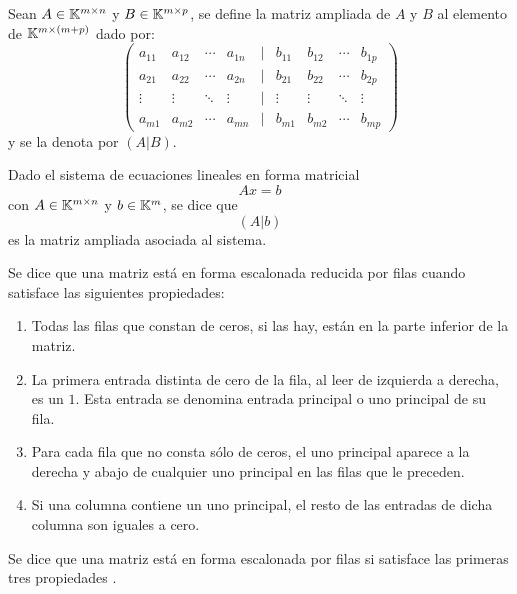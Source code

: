 \documentclass[a4,11pt]{aleph-notas}
\begin{document}
\begin{defi}
    Sean $A\in\Mat[\K]{m}{n}$ y $B\in\Mat[\K]{m}{p}$, se define la matriz ampliada de $A$ y $B$ al elemento de $\Mat[\K]{m}{(m+p)}$ dado por:
    \[
        \begin{pmatrix}
        a_{11}&a_{12}&\cdots&a_{1n}&|&b_{11}&b_{12}&\cdots&b_{1p}\\
        a_{21}&a_{22}&\cdots&a_{2n}&|&b_{21}&b_{22}&\cdots&b_{2p}\\
        \vdots&\vdots&\ddots&\vdots&|&\vdots&\vdots&\ddots&\vdots\\
        a_{m1}&a_{m2}&\cdots&a_{mn}&|&b_{m1}&b_{m2}&\cdots&b_{mp}
        \end{pmatrix}
    \]
    y se la denota por $(A|B)$.
\end{defi}

\begin{defi}
    Dado el sistema de ecuaciones lineales en forma matricial
    \[
        Ax=b
    \]
    con $A\in \Mat[\K]{m}{n}$ y $b\in\K^m$, se dice que 
    \[
        (A|b)
    \]
    es la matriz ampliada asociada al sistema.
\end{defi}

\begin{defi}
    Se dice que una matriz está en forma escalonada reducida por filas cuando satisface las siguientes propiedades:
    \begin{enumerate}
    \item 
        Todas las filas que constan de ceros, si las hay, están en la parte inferior de la matriz. 
    \item 
        La primera entrada distinta de cero de la fila, al leer de izquierda a derecha, es un $1$. Esta entrada se denomina entrada principal o uno principal de su fila. 
    \item 
        Para cada fila que no consta sólo de ceros, el uno principal aparece a la derecha y abajo de cualquier uno principal en las filas que le preceden. 
    \item 
        Si una columna contiene un uno principal, el resto de las entradas de dicha columna son iguales a cero. 
    \end{enumerate}
    Se dice que una matriz está en forma escalonada por filas si satisface las primeras tres propiedades . 
\end{defi}
\end{document}
